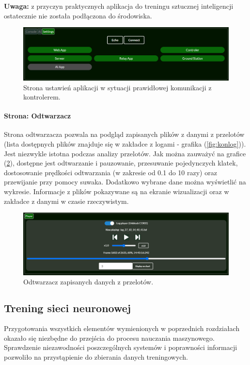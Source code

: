 \documentclass[12pt, a4paper]{article}
\let\oldref\ref
\renewcommand{\ref}[1]{(\oldref{#1})}
\begin{document}
\textbf{Uwaga:} z przyczyn praktycznych aplikacja do treningu sztucznej inteligencji ostatecznie nie została podłączona do środowiska.

 \begin{figure}[H]
    \centering
    \includegraphics[width=1\textwidth]{settings}
    \caption{Strona ustawień aplikacji w sytuacji prawidłowej komunikacji z kontrolerem.}
    \label{fig:settings}
\end{figure}

\paragraph{Strona: Odtwarzacz}\mbox{}

Strona odtwarzacza pozwala na podgląd zapisanych plików z danymi z przelotów (lista dostępnych plików znajduje się w zakładce z logami - grafika \ref{fig:konlog}). Jest niezwykle istotna podczas analizy przelotów. Jak można zauważyć na grafice \ref{fig:player}, dostępne jest odtwarzanie i pauzowanie, przesuwanie pojedynczych klatek, dostosowanie prędkości odtwarzania (w zakresie od 0.1 do 10 razy) oraz przewijanie przy pomocy suwaka. Dodatkowo wybrane dane można wyświetlić na wykresie. Informacje z plików pokazywane są na ekranie wizualizacji oraz w zakładce z danymi w czasie rzeczywistym.

 \begin{figure}[H]
    \centering
    \includegraphics[width=1\textwidth]{player}
    \caption{Odtwarzacz zapisanych danych z przelotów.}
    \label{fig:player}
\end{figure}

\FloatBarrier
\subsection{Trening sieci neuronowej}
Przygotowania wszystkich elementów wymienionych w poprzednich rozdziałach okazało się niezbędne do przejścia do procesu nauczania maszynowego. Sprawdzenie niezawodności poszczególnych systemów i poprawności informacji pozwoliło na przystąpienie do zbierania danych treningowych.
\end{document}
